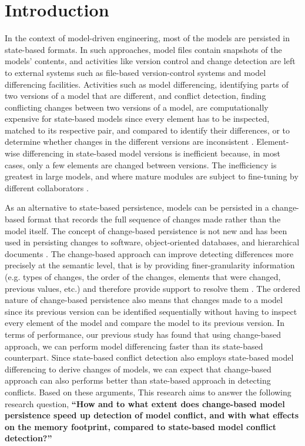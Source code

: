 \section{Introduction}
\label{sec:introduction}
In the context of model-driven engineering, most of the models are persisted in state-based formats. In such approaches, model files contain snapshots of the models' contents, and activities like version control and change detection are left to external systems such as file-based version-control systems and model differencing facilities. Activities such as model differencing, identifying parts of two versions of a model that are different, and conflict detection, finding conflicting changes between two versions of a model, are computationally expensive for state-based models \cite{Kolovos:2009:DMM:1564596.1564641} since every element has to be inspected, matched to its respective pair, and compared to identify their differences, or to determine whether changes in the different versions are inconsistent \cite{emfcompare2018developer}. Element-wise differencing in state-based model versions is inefficient because, in most cases,  only a few elements are changed between versions.  The inefficiency is greatest in large models, and where mature modules are subject to fine-tuning by different collaborators \cite{selic2003pragmatics}. 

As an alternative to state-based persistence, models can be persisted in a change-based format that records the full sequence of changes made rather than the model itself. The concept of change-based persistence is not new and has been used in persisting changes to software, object-oriented databases, and hierarchical documents \cite{DBLP:journals/entcs/RobbesL07,DBLP:conf/sde/LippeO92,DBLP:conf/caise/IgnatN05}. The change-based approach can improve detecting differences more precisely at the semantic level, that is by providing finer-granularity information (e.g. types of changes, the order of the changes, 
elements that were changed, previous values, etc.) and therefore provide support to resolve them \cite{mens2002state}. The ordered nature of change-based persistence also means that changes made to a model since its previous version can be identified sequentially without having to inspect every element of the model and compare the model to its previous version. 
In terms of performance, our previous study \cite{yohannis2019efficient} has found that using change-based approach, we can perform model differencing faster than its state-based counterpart. Since state-based conflict detection also employs state-based model differencing to derive changes of models, we can expect that change-based approach can also performs better than state-based approach in detecting conflicts. Based on these arguments, This research aims to answer the following research question, \textbf{``How and to what extent does change-based model persistence speed up detection of model conflict, and with what effects on the memory footprint, compared to state-based model conflict detection?''} 

